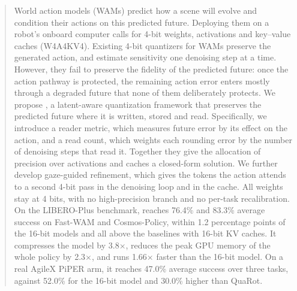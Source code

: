 \begin{abstract}
World action models (WAMs) predict how a scene will evolve and condition their actions on this predicted future.
Deploying them on a robot's onboard computer calls for 4-bit weights, activations and key--value caches (W4A4KV4).
Existing 4-bit quantizers for WAMs preserve the generated action, and estimate sensitivity one denoising step at a time.
However, they fail to preserve the fidelity of the predicted future: once the action pathway is protected, the remaining action error enters mostly through a degraded future that none of them deliberately protects.
We propose \method, a latent-aware quantization framework that preserves the predicted future where it is written, stored and read.
Specifically, we introduce a reader metric, which measures future error by its effect on the action, and a read count, which weights each rounding error by the number of denoising steps that read it.
Together they give the allocation of precision over activations and caches a closed-form solution.
We further develop gaze-guided refinement, which gives the tokens the action attends to a second 4-bit pass in the denoising loop and in the cache.
All weights stay at 4 bits, with no high-precision branch and no per-task recalibration.
On the LIBERO-Plus benchmark, \method reaches 76.4\% and 83.3\% average success on Fast-WAM and Cosmos-Policy, within 1.2 percentage points of the 16-bit models and all above the baselines with 16-bit KV caches.
It compresses the model by 3.8$\times$, reduces the peak GPU memory of the whole policy by 2.3$\times$, and runs 1.66$\times$ faster than the 16-bit model. On a real AgileX PiPER arm, it reaches 47.0\% average success over three tasks, against 52.0\% for the 16-bit model and 30.0\%  higher than QuaRot.
\end{abstract}
